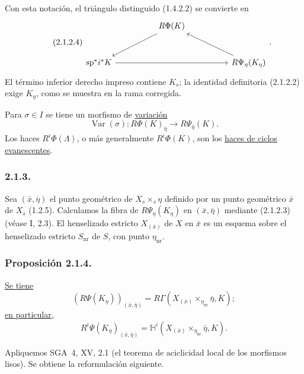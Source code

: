 Con esta notación, el triángulo distinguido (1.4.2.2) se convierte en
\begin{equation}\tag{2.1.2.4}
\begin{tikzcd}[row sep=large, column sep=huge]
{} & R\Phi(K) \arrow[dl] & {} \\
\mathrm{sp}^*i^*K \arrow[rr] & {}
  & R\Psi_\eta(K_{\sisi{s}{\eta}}) \arrow[ul]
\end{tikzcd}
.
\end{equation}
El término inferior derecho impreso contiene $K_s$; la identidad definitoria
(2.1.2.2) exige $K_\eta$, como se muestra en la rama corregida.

Para $\sigma\in I$ se tiene un morfismo de \underline{variación}
\begin{equation}\tag{2.1.2.5}
\operatorname{Var}(\sigma):R\Phi(K)_{\bar\eta}
\longrightarrow R\Psi_{\bar\eta}(K).
\end{equation}
Los haces $R^i\Phi(\Lambda)$, o más generalmente $R^i\Phi(K)$, son los
\underline{haces de ciclos evanescentes}.

\subsubsection*{2.1.3.}
Sea $(\bar x,\bar\eta)$ el punto geométrico de $X_s\times_s\eta$ definido
por un punto geométrico $\bar x$ de $X_{\bar s}$ (1.2.5). Calculamos la fibra
de $R\Psi_\eta(K_\eta)$ en $(\bar x,\bar\eta)$ mediante (2.1.2.3) (véase I,
2.3). El henselizado estricto $X_{(\bar x)}$ de $X$ en $\bar x$ es un esquema
sobre el henselizado estricto $S_{\mathrm{nr}}$ de $S$, con punto  $\eta_{\mathrm{nr}}$.

\subsubsection*{Proposición 2.1.4.}
\underline{Se tiene}
\begin{equation*}
(R\Psi(K_\eta))_{(\bar x,\bar\eta)}
=R\Gamma\!\left(
X_{(\bar x)}\times_{\eta_{\mathrm{nr}}}\bar\eta,K
\right);
\end{equation*}
\underline{en particular,}
\begin{equation*}
R^i\Psi(K_\eta)_{(\bar x,\bar\eta)}
=\mathbb H^i\!\left(
X_{(\bar x)}\times_{\eta_{\mathrm{nr}}}\bar\eta,K
\right).
\end{equation*}

Apliquemos SGA~4, XV, 2.1 (el teorema de aciclicidad local de los morfismos
lisos). Se obtiene la reformulación siguiente.

